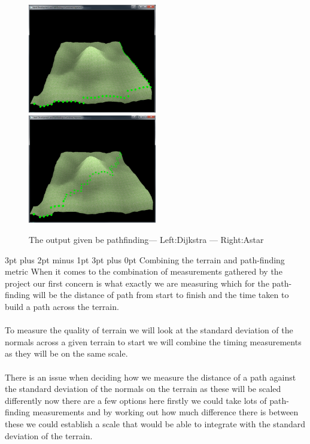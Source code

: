 \documentclass[12pt,a4paper]{article}
\makeatletter
\renewcommand\subsection{\@startsection {subsection}{1}{2mm} %
                               {3pt plus 2pt minus 1pt} %
                               {3pt plus 0pt} %
                               {\normalfont\bfseries}}
\makeatother
\begin{document}
\begin{figure}[ht!]
	\includegraphics[width=0.5\textwidth]{images/Dijkstra}
	\includegraphics[width=0.5\textwidth]{images/Astar}
	\caption{The output given be pathfinding--- Left:Dijkstra --- Right:Astar} \label{Dijkstrafind}
\end{figure}

\pagebreak
\subsection{Combining the terrain and path-finding metric}
When it comes to the combination of measurements gathered by the project our first concern is what exactly we are measuring which for the path-finding will be the distance of path from start to finish and the time taken to build a path across the terrain.\\\\To measure the quality of terrain we will look at the standard deviation of the normals across a given terrain to start we will combine the timing measurements as they will be on the same scale.\\\\ There is an issue when deciding how we measure the distance of a path against the standard deviation of the normals on the terrain as these will be scaled differently now there are a few options here firstly we could take lots of path-finding measurements and by working out how much difference there is between these we could establish a scale that would be able to integrate with the standard deviation of the terrain.      
\end{document}
